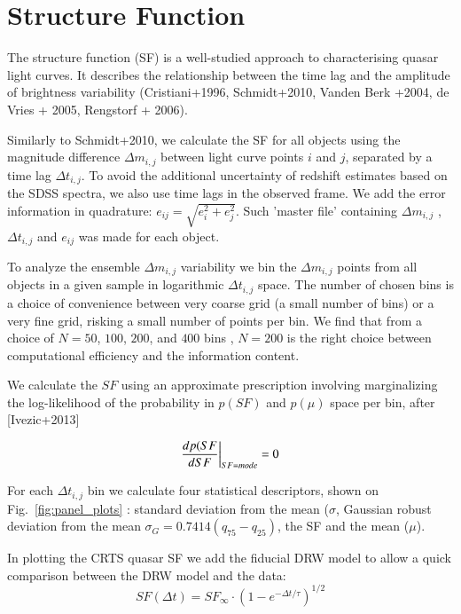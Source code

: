 \documentclass[fleqn,usenatbib]{mnras}  %
\begin{document}
\section{Structure Function}

The structure function (SF) is a well-studied approach to characterising quasar light curves. It describes the relationship between the time lag and the amplitude of brightness variability (Cristiani+1996, Schmidt+2010, Vanden Berk +2004, de Vries + 2005, Rengstorf + 2006). 

 Similarly to Schmidt+2010, we  calculate the SF for all objects  using  the magnitude difference $\Delta m _{i,j}$ between light curve points $i$ and $j$, separated by a time lag $\Delta t_{i,j}$. To avoid the additional uncertainty of redshift estimates based on the SDSS spectra, we also use time lags in the observed frame. We add the error information in quadrature: $e_{ij} = \sqrt{e_{i}^{2}+e_{j}^{2}}$. Such 'master file' containing  $\Delta m _{i,j}$ , 
$\Delta t_{i,j}$ and $e_{ij} $ was made for each object. 

To analyze the ensemble $\Delta m _{i,j}$  variability  we bin the $\Delta m _{i,j}$ points from all objects in a given sample  in logarithmic $\Delta t_{i,j}$  space. The number of chosen bins is a choice of convenience between very coarse grid (a small number of bins) or a very fine grid, risking a small number of points per bin. We find that from  a choice of $N=$$50$, $100$, $200$, and $400$ bins ,  $N=200$ is the right choice between computational efficiency and the information content. 

We calculate the $SF$ using an approximate prescription involving marginalizing the log-likelihood of the probability in $p(SF)$ and $p(\mu)$ space per bin, after [Ivezic+2013]
 
\begin{equation}
\centering
\frac{d p(SF}{d SF } \bigg| _{SF = mode} = 0
\end{equation}

For each $\Delta t_{i,j}$  bin we calculate four statistical descriptors, shown on Fig.~\ref{fig:panel_plots} :  standard deviation from the mean ($\sigma$, Gaussian robust deviation from the mean $\sigma_{G}=0.7414 (q_{75}-q_{25})$,  the SF and the mean ($\mu$).  

In plotting the CRTS quasar SF we  add the  fiducial DRW  model to allow a quick comparison between the DRW model and the data:
\begin{equation}
SF(\Delta t) = SF_{\infty} \cdot \left( 1-e^{-\Delta t / \tau} \right) ^ {1/2}
\end{equation}
\end{document}

